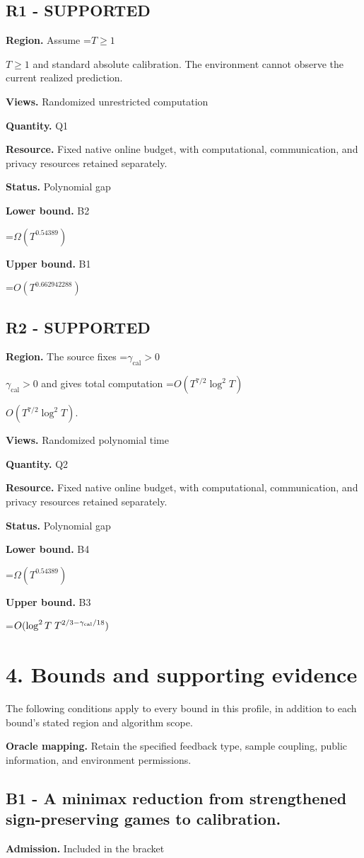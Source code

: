\documentclass[10pt,a4paper]{article}
\newcommand{\AtlasMath}[1]{\par\begingroup\centering\setbox0=\hbox{$\displaystyle #1$}\ifdim\wd0>1.4\linewidth\typeout{ATLAS WIDE FORMULA: \the\wd0}\fi\ifdim\wd0>\linewidth\resizebox{\linewidth}{!}{\box0}\else\box0\fi\par\endgroup}
\newcommand{\AtlasInlineMath}[1]{\begingroup\setbox0=\hbox{$#1$}\ifdim\wd0>.4\linewidth\endgroup\AtlasMath{#1}\else\endgroup$#1$\fi}
\begin{document}
\subsection{R1 - SUPPORTED}
\textbf{Region.} Assume \AtlasInlineMath{T\ge1} and standard absolute calibration. The environment cannot observe the current realized prediction.

\textbf{Views.} Randomized unrestricted computation

\textbf{Quantity.} Q1

\textbf{Resource.} Fixed native online budget, with computational, communication, and privacy resources retained separately.

\textbf{Status.} Polynomial gap

\textbf{Lower bound.} B2

\AtlasMath{\Omega(T^{0.54389})}
\textbf{Upper bound.} B1

\AtlasMath{O(T^{0.662942288})}
\subsection{R2 - SUPPORTED}
\textbf{Region.} The source fixes \AtlasInlineMath{\gamma_{\mathrm{cal}}>0} and gives total computation \AtlasInlineMath{O(T^{7/2}\log^2T)}.

\textbf{Views.} Randomized polynomial time

\textbf{Quantity.} Q2

\textbf{Resource.} Fixed native online budget, with computational, communication, and privacy resources retained separately.

\textbf{Status.} Polynomial gap

\textbf{Lower bound.} B4

\AtlasMath{\Omega(T^{0.54389})}
\textbf{Upper bound.} B3

\AtlasMath{O(\log^2T\;T^{2/3-\gamma_{\rm cal}/18})}
\section{4. Bounds and supporting evidence}
The following conditions apply to every bound in this profile, in addition to each bound's stated region and algorithm scope.

\textbf{Oracle mapping.} Retain the specified feedback type, sample coupling, public information, and environment permissions.

\subsection{B1 - A minimax reduction from strengthened sign-preserving games to calibration.}
\textbf{Admission.} Included in the bracket
\end{document}
